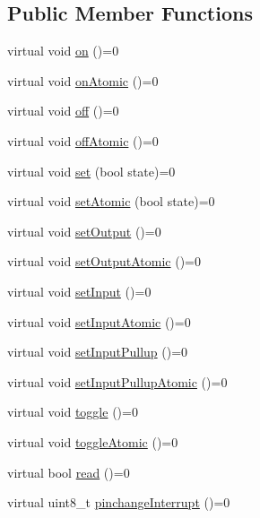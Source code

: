 \subsection*{Public Member Functions}
\begin{DoxyCompactItemize}
\item 
virtual void \hyperlink{classflame_1_1_pin_a662d1c9ebe06f39eca0b344cdcacf71e}{on} ()=0
\item 
virtual void \hyperlink{classflame_1_1_pin_a92602dd2050757ac05f822ffac6c96d4}{on\-Atomic} ()=0
\item 
virtual void \hyperlink{classflame_1_1_pin_a275c305cc869a36b77c6642d2122a7e4}{off} ()=0
\item 
virtual void \hyperlink{classflame_1_1_pin_ab2c12ae2715f4768478920dc8cd047bd}{off\-Atomic} ()=0
\item 
virtual void \hyperlink{classflame_1_1_pin_aef5519e00e077ca3d9bf1045c54bb245}{set} (bool state)=0
\item 
virtual void \hyperlink{classflame_1_1_pin_ad255caef4f0f6b8f1fe886800afa90b5}{set\-Atomic} (bool state)=0
\item 
virtual void \hyperlink{classflame_1_1_pin_af8941ca0d0284049babc1823ab67366c}{set\-Output} ()=0
\item 
virtual void \hyperlink{classflame_1_1_pin_a1cdaa26a0e0fd3625c1857597796b37b}{set\-Output\-Atomic} ()=0
\item 
virtual void \hyperlink{classflame_1_1_pin_a2a236681d735dfc3120fc52b3247318a}{set\-Input} ()=0
\item 
virtual void \hyperlink{classflame_1_1_pin_a9c60f31713a6052d9529017a6eed00e0}{set\-Input\-Atomic} ()=0
\item 
virtual void \hyperlink{classflame_1_1_pin_adcfde4a13f068347b0d2110e37aa0cb7}{set\-Input\-Pullup} ()=0
\item 
virtual void \hyperlink{classflame_1_1_pin_a9c597d09c521128beaf56729c2b083c5}{set\-Input\-Pullup\-Atomic} ()=0
\item 
virtual void \hyperlink{classflame_1_1_pin_a00d7d0568ac59b73879cab10d701d1b4}{toggle} ()=0
\item 
virtual void \hyperlink{classflame_1_1_pin_af4a4cd28d03658822ec37c4418d42a06}{toggle\-Atomic} ()=0
\item 
virtual bool \hyperlink{classflame_1_1_pin_a388fcf1d1902a306aa1f4d8fa18876f3}{read} ()=0
\item 
virtual uint8\-\_\-t \hyperlink{classflame_1_1_pin_a6ccab19cacc3a29d488c21af979389b6}{pinchange\-Interrupt} ()=0
\item 

\end{DoxyCompactItemize}
